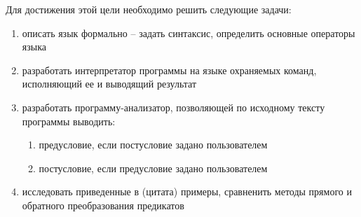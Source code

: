 Для достижения этой цели необходимо решить следующие задачи:
\begin{enumerate}
	\item описать язык формально -- задать синтаксис, определить основные операторы языка
	\item разработать интерпретатор программы на языке охраняемых команд, исполняющий ее и выводящий результат
	\item разработать программу-анализатор, позволяющей по исходному тексту программы выводить:
		\begin{enumerate}
			\item предусловие, если постусловие задано пользователем
			\item постусловие, если предусловие задано пользователем
		\end{enumerate}		
	\item исследовать приведенные в (цитата) примеры, сравненить методы прямого и обратного преобразования предикатов
\end{enumerate} 


